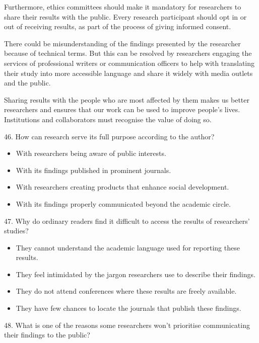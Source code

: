 \documentclass[UTF8,11pt]{ctexart}
\begin{document}
Furthermore, ethics committees should make it mandatory for researchers to share their results with the public. Every research participant should opt in or out of receiving results, as part of the process of giving informed consent.


There could be misunderstanding of the findings presented by the researcher because of technical terms. But this can be resolved by researchers engaging the services of professional writers or communication officers to help with translating their study into more accessible language and share it widely with media outlets and the public.


Sharing results with the people who are most affected by them makes us better researchers and ensures that our work can be used to improve people’s lives. Institutions and collaborators must recognise the value of doing so.


46. How can research serve its full purpose according to the author?


\begin{itemize}[leftmargin=2em,itemsep=.2em,topsep=.4em]\item[A.] With researchers being aware of public interests.
\item[B.] With its findings published in prominent journals.
\item[C.] With researchers creating products that enhance social development.
\item[D.] With its findings properly communicated beyond the academic circle.
\end{itemize}

47. Why do ordinary readers find it difficult to access the results of researchers’ studies?


\begin{itemize}[leftmargin=2em,itemsep=.2em,topsep=.4em]\item[A.] They cannot understand the academic language used for reporting these results.
\item[B.] They feel intimidated by the jargon researchers use to describe their findings.
\item[C.] They do not attend conferences where these results are freely available.
\item[D.] They have few chances to locate the journals that publish these findings.
\end{itemize}

48. What is one of the reasons some researchers won’t prioritise communicating their findings to the public?
\end{document}
